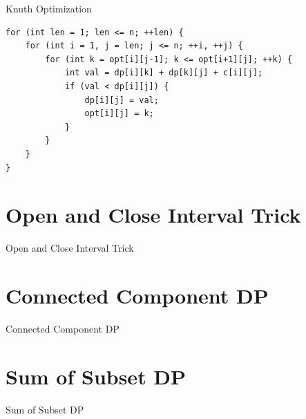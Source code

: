 \documentclass[aspectratio=169,xcolor=dvipsnames]{beamer}
\begin{document}
\begin{frame}{Knuth Optimization}
\begin{examples}
\begin{verbatim}
for (int len = 1; len <= n; ++len) {
    for (int i = 1, j = len; j <= n; ++i, ++j) {
        for (int k = opt[i][j-1]; k <= opt[i+1][j]; ++k) {
            int val = dp[i][k] + dp[k][j] + c[i][j];
            if (val < dp[i][j]) {
                dp[i][j] = val;
                opt[i][j] = k;
            }
        }
    }
}
\end{verbatim}
\end{examples}
\end{frame}

\section{Open and Close Interval Trick}
\begin{frame}[plain]{Open and Close Interval Trick}
\end{frame}
\section{Connected Component DP}
\begin{frame}[plain]{Connected Component DP}
\end{frame}
\section{Sum of Subset DP}
\begin{frame}[plain]{Sum of Subset DP}
\end{frame}
\end{document}
